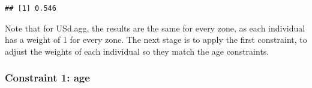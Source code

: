 \begin{Shaded}
\begin{Highlighting}[]
\NormalTok{(}\NormalTok{(}\NormalTok{(}
\end{Highlighting}
\end{Shaded}
\begin{verbatim}
## [1] 0.546
\end{verbatim}
Note that for USd.agg, the results are the same for every zone, as each
individual has a weight of 1 for every zone. The next stage is to apply
the first constraint, to adjust the weights of each individual so they
match the age constraints.

\subsubsection{Constraint 1: age}

